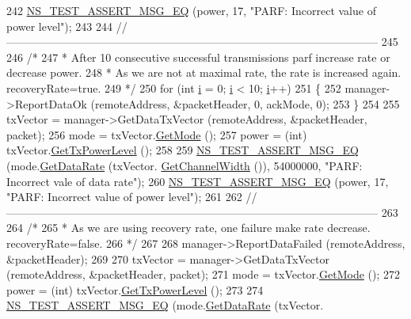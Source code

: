 \begin{DoxyCode}
242   \hyperlink{group__testing_ga2a9d78cffb3db8e867c35fff0b698cf5}{NS\_TEST\_ASSERT\_MSG\_EQ} (power, 17, \textcolor{stringliteral}{"PARF: Incorrect value of power level"});
243 
244   \textcolor{comment}{//-----------------------------------------------------------------------------------------------------}
245 
246   \textcolor{comment}{/*}
247 \textcolor{comment}{   * After 10 consecutive successful transmissions parf increase rate or decrease power.}
248 \textcolor{comment}{   * As we are not at maximal rate, the rate is increased again. recoveryRate=true.}
249 \textcolor{comment}{   */}
250   \textcolor{keywordflow}{for} (\textcolor{keywordtype}{int} \hyperlink{bernuolliDistribution_8m_a6f6ccfcf58b31cb6412107d9d5281426}{i} = 0; \hyperlink{bernuolliDistribution_8m_a6f6ccfcf58b31cb6412107d9d5281426}{i} < 10; \hyperlink{bernuolliDistribution_8m_a6f6ccfcf58b31cb6412107d9d5281426}{i}++)
251     \{
252       manager->ReportDataOk (remoteAddress, &packetHeader, 0, ackMode, 0);
253     \}
254 
255   txVector = manager->GetDataTxVector (remoteAddress, &packetHeader, packet);
256   mode = txVector.\hyperlink{classns3_1_1WifiTxVector_a497b1f11cad4b8b26251dfa07c9ad1d6}{GetMode} ();
257   power = (int) txVector.\hyperlink{classns3_1_1WifiTxVector_a7c98bd9609ff1c5cefa6e22d6908a2fe}{GetTxPowerLevel} ();
258 
259   \hyperlink{group__testing_ga2a9d78cffb3db8e867c35fff0b698cf5}{NS\_TEST\_ASSERT\_MSG\_EQ} (mode.\hyperlink{classns3_1_1WifiMode_adcfbe150f69da720db23387f733b8a52}{GetDataRate} (txVector.
      \hyperlink{classns3_1_1WifiTxVector_a1f8bfa51778a3e217581eb665f059564}{GetChannelWidth} ()), 54000000, \textcolor{stringliteral}{"PARF: Incorrect vale of data rate"});
260   \hyperlink{group__testing_ga2a9d78cffb3db8e867c35fff0b698cf5}{NS\_TEST\_ASSERT\_MSG\_EQ} (power, 17, \textcolor{stringliteral}{"PARF: Incorrect value of power level"});
261 
262   \textcolor{comment}{//-----------------------------------------------------------------------------------------------------}
263 
264   \textcolor{comment}{/*}
265 \textcolor{comment}{   * As we are using recovery rate, one failure make rate decrease. recoveryRate=false.}
266 \textcolor{comment}{   */}
267 
268   manager->ReportDataFailed (remoteAddress, &packetHeader);
269 
270   txVector = manager->GetDataTxVector (remoteAddress, &packetHeader, packet);
271   mode = txVector.\hyperlink{classns3_1_1WifiTxVector_a497b1f11cad4b8b26251dfa07c9ad1d6}{GetMode} ();
272   power = (int) txVector.\hyperlink{classns3_1_1WifiTxVector_a7c98bd9609ff1c5cefa6e22d6908a2fe}{GetTxPowerLevel} ();
273 
274   \hyperlink{group__testing_ga2a9d78cffb3db8e867c35fff0b698cf5}{NS\_TEST\_ASSERT\_MSG\_EQ} (mode.\hyperlink{classns3_1_1WifiMode_adcfbe150f69da720db23387f733b8a52}{GetDataRate} (txVector.

\end{DoxyCode}

